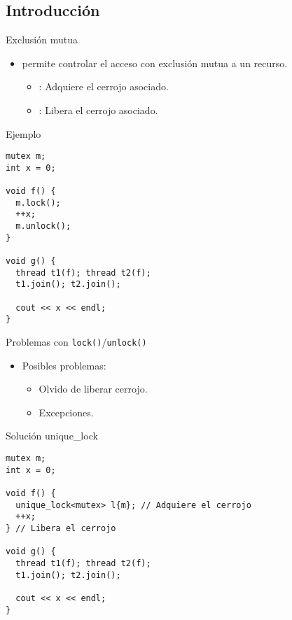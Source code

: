 \subsection{Introducción}

\begin{frame}[fragile]{Exclusión mutua}
\begin{itemize}
  \item {} permite controlar el acceso con exclusión mutua a un recurso.
    \begin{itemize}
      \item {}: Adquiere el cerrojo asociado.
      \item {}: Libera el cerrojo asociado.
    \end{itemize}
\end{itemize}
\pause
\begin{block}{Ejemplo}
\begin{lstlisting}
mutex m;
int x = 0;

void f() {
  m.lock();
  ++x;
  m.unlock();
}

void g() {
  thread t1(f); thread t2(f);
  t1.join(); t2.join();

  cout << x << endl;
}
\end{lstlisting}
\end{block}
\end{frame}

\begin{frame}[fragile]{Problemas con \texttt{lock()}/\texttt{unlock()}}
\begin{itemize}
  \item Posibles problemas:
    \begin{itemize}
      \item Olvido de liberar cerrojo.
      \item Excepciones.
    \end{itemize}
\end{itemize}
\pause
\begin{block}{Solución unique\_lock}
\begin{lstlisting}
mutex m;
int x = 0;

void f() {
  unique_lock<mutex> l{m}; // Adquiere el cerrojo
  ++x;
} // Libera el cerrojo

void g() {
  thread t1(f); thread t2(f);
  t1.join(); t2.join();

  cout << x << endl;
}
\end{lstlisting}
\end{block}
\end{frame}

